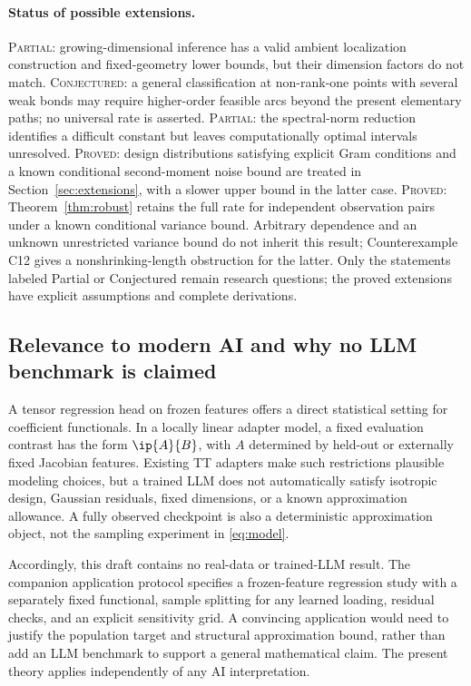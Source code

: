 \paragraph{Status of possible extensions.}
\textsc{Partial}: growing-dimensional inference has a valid ambient localization construction and fixed-geometry lower bounds, but their dimension factors do not match. \textsc{Conjectured}: a general classification at non-rank-one points with several weak bonds may require higher-order feasible arcs beyond the present elementary paths; no universal rate is asserted. \textsc{Partial}: the spectral-norm reduction identifies a difficult constant but leaves computationally optimal intervals unresolved. \textsc{Proved}: design distributions satisfying explicit Gram conditions and a known conditional second-moment noise bound are treated in Section~\ref{sec:extensions}, with a slower upper bound in the latter case. \textsc{Proved}: Theorem~\ref{thm:robust} retains the full rate for independent observation pairs under a known conditional variance bound. Arbitrary dependence and an unknown unrestricted variance bound do not inherit this result; Counterexample C12 gives a nonshrinking-length obstruction for the latter. Only the statements labeled Partial or Conjectured remain research questions; the proved extensions have explicit assumptions and complete derivations.

\subsection{Relevance to modern AI and why no LLM benchmark is claimed}
A tensor regression head on frozen features offers a direct statistical setting for coefficient functionals. In a locally linear adapter model, a fixed evaluation contrast has the form $\ip{A}{B}$, with $A$ determined by held-out or externally fixed Jacobian features. Existing TT adapters make such restrictions plausible modeling choices, but a trained LLM does not automatically satisfy isotropic design, Gaussian residuals, fixed dimensions, or a known approximation allowance. A fully observed checkpoint is also a deterministic approximation object, not the sampling experiment in \eqref{eq:model}.

Accordingly, this draft contains no real-data or trained-LLM result. The companion application protocol specifies a frozen-feature regression study with a separately fixed functional, sample splitting for any learned loading, residual checks, and an explicit sensitivity grid. A convincing application would need to justify the population target and structural approximation bound, rather than add an LLM benchmark to support a general mathematical claim. The present theory applies independently of any AI interpretation.

